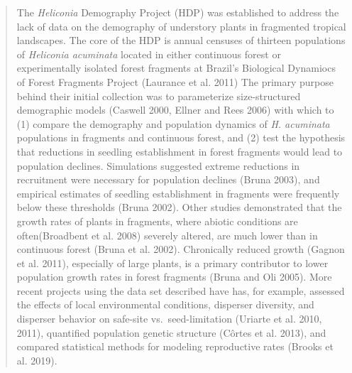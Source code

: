 \documentclass[
  12pt,
  man, donotrepeattitle,floatsintext]{apa6}
\begin{document}
\begin{quote}
The \emph{Heliconia} Demography Project (HDP) was established to address the lack of data on the demography of understory plants in fragmented tropical landscapes. The core of the HDP is annual censuses of thirteen populations of \emph{Heliconia acuminata} located in either continuous forest or experimentally isolated forest fragments at Brazil's Biological Dynamiocs of Forest Fragments Project (Laurance et al. 2011) The primary purpose behind their initial collection was to parameterize size-structured demographic models (Caswell 2000, Ellner and Rees 2006) with which to (1) compare the demography and population dynamics of \emph{H. acuminata} populations in fragments and continuous forest, and (2) test the hypothesis that reductions in seedling establishment in forest fragments would lead to population declines. Simulations suggested extreme reductions in recruitment were necessary for population declines (Bruna 2003), and empirical estimates of seedling establishment in fragments were frequently below these thresholds (Bruna 2002). Other studies demonstrated that the growth rates of plants in fragments, where abiotic conditions are often(Broadbent et al. 2008) severely altered, are much lower than in continuous forest (Bruna et al. 2002). Chronically reduced growth (Gagnon et al. 2011), especially of large plants, is a primary contributor to lower population growth rates in forest fragments (Bruna and Oli 2005). More recent projects using the data set described have has, for example, assessed the effects of local environmental conditions, disperser diversity, and disperser behavior on safe-site vs.~seed-limitation (Uriarte et al. 2010, 2011), quantified population genetic structure (Côrtes et al. 2013), and compared statistical methods for modeling reproductive rates (Brooks et al. 2019).
\end{quote}
\end{document}
